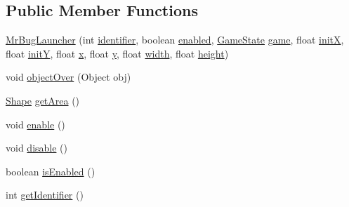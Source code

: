 \subsection*{Public Member Functions}
\begin{DoxyCompactItemize}
\item 
\mbox{\hyperlink{classentities_1_1_mr_bug_launcher_a2719be79c4eef1d1bf1ce74747883250}{Mr\+Bug\+Launcher}} (int \mbox{\hyperlink{classentities_1_1_mr_bug_launcher_aa9cb24696faf408110cd4bcbfb0dd6e0}{identifier}}, boolean \mbox{\hyperlink{classentities_1_1_mr_bug_launcher_a7a137e2093be1b7ebc830d8c10db42b1}{enabled}}, \mbox{\hyperlink{classstates_1_1_game_state}{Game\+State}} \mbox{\hyperlink{classentities_1_1_mr_bug_launcher_add442b81d844af299fb25599051e4d33}{game}}, float \mbox{\hyperlink{classentities_1_1_mr_bug_launcher_aa421d56d0611c8922cdbde7bb29389bd}{initX}}, float \mbox{\hyperlink{classentities_1_1_mr_bug_launcher_a328d350bac019351356862476e8d8633}{initY}}, float \mbox{\hyperlink{classorg_1_1newdawn_1_1slick_1_1geom_1_1_shape_a3e985bfff386c15a4efaad03d8ad60d3}{x}}, float \mbox{\hyperlink{classorg_1_1newdawn_1_1slick_1_1geom_1_1_shape_a9f934baded6a1b65ebb69e7e5f80ea00}{y}}, float \mbox{\hyperlink{classorg_1_1newdawn_1_1slick_1_1geom_1_1_rectangle_a967e1823f62daf45abb142779d1be62d}{width}}, float \mbox{\hyperlink{classorg_1_1newdawn_1_1slick_1_1geom_1_1_rectangle_a3bd010fdce636fc11ed0e0ad4d4b4a0a}{height}})
\item 
void \mbox{\hyperlink{classentities_1_1_mr_bug_launcher_a036f3d0b9c8faafa000c44a34ca77b2e}{object\+Over}} (Object obj)
\item 
\mbox{\hyperlink{classorg_1_1newdawn_1_1slick_1_1geom_1_1_shape}{Shape}} \mbox{\hyperlink{classentities_1_1_mr_bug_launcher_a088ee997aa4bd9c04748b6339b682391}{get\+Area}} ()
\item 
void \mbox{\hyperlink{classentities_1_1_mr_bug_launcher_a5ed27f4fcd413382a04c839e90e5e493}{enable}} ()
\item 
void \mbox{\hyperlink{classentities_1_1_mr_bug_launcher_a79e2867ec5db217d1b291e9331e7b0ca}{disable}} ()
\item 
boolean \mbox{\hyperlink{classentities_1_1_mr_bug_launcher_a41dc8f25473307d087c9066562566059}{is\+Enabled}} ()
\item 
int \mbox{\hyperlink{classentities_1_1_mr_bug_launcher_ab08c44ece87cd133b59f95ab78ca9d44}{get\+Identifier}} ()
\end{DoxyCompactItemize}
